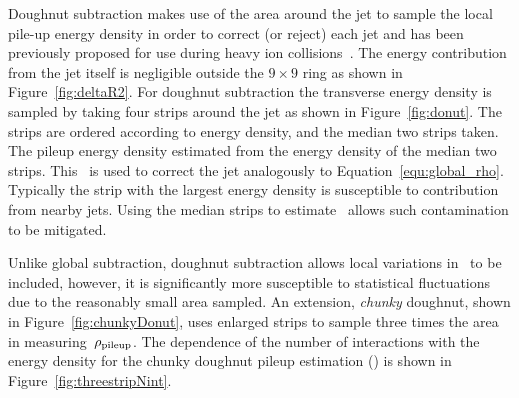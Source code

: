 Doughnut subtraction makes use of the area around the jet to sample the local pile-up
energy density in order to correct (or reject) each jet and has been previously proposed
for use during heavy ion collisions~\cite{doughnut}. The energy contribution from the jet
itself is negligible outside the $9\times9$ ring as shown in Figure~\ref{fig:deltaR2}. 
For doughnut subtraction the transverse energy density is sampled by taking four strips around 
the jet as shown in Figure~\ref{fig:donut}. The strips are ordered according to energy density,
and the median two strips taken. The pileup energy density estimated from the 
energy density of the median two strips. This \rhoD~is used to correct the
jet analogously to Equation~\ref{equ:global_rho}. Typically the strip with the largest
energy density is susceptible to contribution from nearby jets. Using the median 
strips to estimate \rhoP~allows such contamination to be mitigated.

Unlike global subtraction, doughnut subtraction allows local variations in \rhoP~to be 
included, however, it is significantly more susceptible to statistical fluctuations due to the 
reasonably small area sampled. An extension, \emph{chunky} doughnut, shown in Figure~\ref{fig:chunkyDonut},
uses enlarged strips to sample three times the area in measuring~$\rho_{\text{pileup}}$. The dependence of the number of interactions
with the energy density for the chunky doughnut pileup estimation (\rhoC) is shown in Figure~\ref{fig:threestripNint}.

